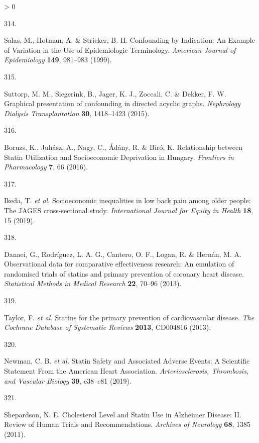 \documentclass[a4paper, twoside]{templates/ociamthesis}
\newlength{\cslhangindent}
\newlength{\csllabelwidth}
\newenvironment{CSLReferences}[3] %
 {%
  \setlength{\parindent}{0pt}
  \ifodd #1 \everypar{\setlength{\hangindent}{\cslhangindent}}\ignorespaces\fi
  \ifnum #2 > 0
  \setlength{\parskip}{#2\baselineskip}
  \fi
 }%
 {}
\newcommand{\CSLLeftMargin}[1]{\parbox[t]{\maxof{\widthof{#1}}{\csllabelwidth}}{#1}}
\newcommand{\CSLRightInline}[1]{\parbox[t]{\linewidth - \csllabelwidth}{#1}}
\begin{document}
\begin{CSLReferences}{0}{0}
\leavevmode\hypertarget{ref-salas1999}{}%
\CSLLeftMargin{314. }
\CSLRightInline{Salas, M., Hotman, A. \& Stricker, B. H. Confounding by {Indication}: An {Example} of {Variation} in the {Use} of {Epidemiologic Terminology}. \emph{American Journal of Epidemiology} \textbf{149}, 981--983 (1999).}

\leavevmode\hypertarget{ref-suttorp2015}{}%
\CSLLeftMargin{315. }
\CSLRightInline{Suttorp, M. M., Siegerink, B., Jager, K. J., Zoccali, C. \& Dekker, F. W. Graphical presentation of confounding in directed acyclic graphs. \emph{Nephrology Dialysis Transplantation} \textbf{30}, 1418--1423 (2015).}

\leavevmode\hypertarget{ref-boruzs2016}{}%
\CSLLeftMargin{316. }
\CSLRightInline{Boruzs, K., Juhász, A., Nagy, C., Ádány, R. \& Bíró, K. Relationship between {Statin Utilization} and {Socioeconomic Deprivation} in {Hungary}. \emph{Frontiers in Pharmacology} \textbf{7}, 66 (2016).}

\leavevmode\hypertarget{ref-ikeda2019}{}%
\CSLLeftMargin{317. }
\CSLRightInline{Ikeda, T. \emph{et al.} Socioeconomic inequalities in low back pain among older people: The {JAGES} cross-sectional study. \emph{International Journal for Equity in Health} \textbf{18}, 15 (2019).}

\leavevmode\hypertarget{ref-danaei2013}{}%
\CSLLeftMargin{318. }
\CSLRightInline{Danaei, G., Rodríguez, L. A. G., Cantero, O. F., Logan, R. \& Hernán, M. A. Observational data for comparative effectiveness research: An emulation of randomised trials of statins and primary prevention of coronary heart disease. \emph{Statistical Methods in Medical Research} \textbf{22}, 70--96 (2013).}

\leavevmode\hypertarget{ref-taylor2013}{}%
\CSLLeftMargin{319. }
\CSLRightInline{Taylor, F. \emph{et al.} Statins for the primary prevention of cardiovascular disease. \emph{The Cochrane Database of Systematic Reviews} \textbf{2013}, CD004816 (2013).}

\leavevmode\hypertarget{ref-newman2019}{}%
\CSLLeftMargin{320. }
\CSLRightInline{Newman, C. B. \emph{et al.} Statin {Safety} and {Associated Adverse Events}: A {Scientific Statement From} the {American Heart Association}. \emph{Arteriosclerosis, Thrombosis, and Vascular Biology} \textbf{39}, e38--e81 (2019).}

\leavevmode\hypertarget{ref-shepardson2011}{}%
\CSLLeftMargin{321. }
\CSLRightInline{Shepardson, N. E. Cholesterol {Level} and {Statin Use} in {Alzheimer Disease}: {II}. {Review} of {Human Trials} and {Recommendations}. \emph{Archives of Neurology} \textbf{68}, 1385 (2011).}


\end{CSLReferences}
\end{document}
